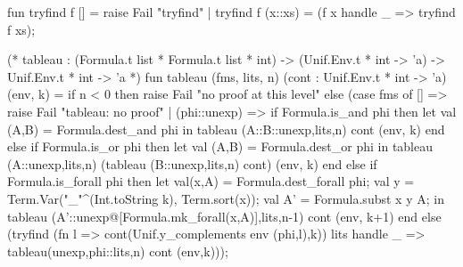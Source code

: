 \nwenddocs{}\endmoddef\nwstartdeflinemarkup{}\nwenddeflinemarkup
fun tryfind f [] = raise Fail "tryfind"
  | tryfind f (x::xs) = (f x
                         handle _ => tryfind f xs);

(* tableau : (Formula.t list * Formula.t list * int) ->
                (Unif.Env.t * int -> 'a) ->
                Unif.Env.t * int -> 'a *)
fun tableau (fms, lits, n) (cont : Unif.Env.t * int -> 'a) (env, k) =
  if n < 0 then raise Fail "no proof at this level"
  else
    (case fms of
      [] => raise Fail "tableau: no proof"
    | (phi::unexp) =>
        if Formula.is_and phi
        then let val (A,B) = Formula.dest_and phi
             in tableau (A::B::unexp,lits,n) cont (env, k) end
        else if Formula.is_or phi
        then let val (A,B) = Formula.dest_or phi
             in tableau (A::unexp,lits,n)
                        (tableau (B::unexp,lits,n) cont)
                        (env, k)
             end
        else if Formula.is_forall phi
        then let val(x,A) = Formula.dest_forall phi;
                 val y = Term.Var("_"^(Int.toString k), Term.sort(x));
                 val A' = Formula.subst x y A;
             in tableau (A'::unexp@[Formula.mk_forall(x,A)],lits,n-1) cont (env, k+1) end
        else
         (tryfind (fn l => cont(Unif.y_complements env (phi,l),k))
                  lits
         handle _ => tableau(unexp,phi::lits,n) cont (env,k)));

